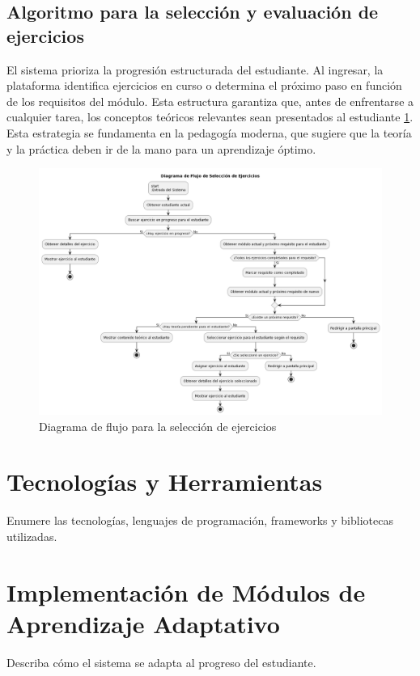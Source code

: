 \subsection{Algoritmo para la selección y evaluación de ejercicios}

El sistema prioriza la progresión estructurada del estudiante. Al ingresar, la plataforma identifica ejercicios en curso o determina el próximo paso en función de los requisitos del módulo. Esta estructura garantiza que, antes de enfrentarse a cualquier tarea, los conceptos teóricos relevantes sean presentados al estudiante \ref{fig:seleccion}. Esta estrategia se fundamenta en la pedagogía moderna, que sugiere que la teoría y la práctica deben ir de la mano para un aprendizaje óptimo.

\begin{figure}[H]
\centering
\includegraphics[width=\textwidth]{imagenes/seleccionejercicios.png}
\caption{Diagrama de flujo para la selección de ejercicios}
\label{fig:seleccion}
\end{figure}

\section{Tecnologías y Herramientas}
Enumere las tecnologías, lenguajes de programación, frameworks y bibliotecas utilizadas.

\section{Implementación de Módulos de Aprendizaje Adaptativo}
Describa cómo el sistema se adapta al progreso del estudiante.
